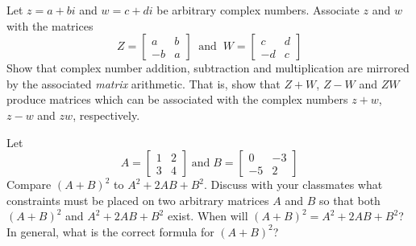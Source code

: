 \documentclass{ximera}
\begin{document}
\begin{problem}
Let $z = a + bi$ and $w = c + di$ be arbitrary complex numbers.  Associate $z$ and $w$ with the matrices \[Z = \left[ \begin{array}{rr} a & b \\ -b & a \end{array} \right] \;\; \mbox{and} \;\; W = \left[ \begin{array}{rr} c & d \\ -d & c \end{array} \right]\]  Show that complex number addition, subtraction and multiplication are mirrored by the associated \emph{matrix} arithmetic.  That is, show that $Z + W$, $Z - W$ and $ZW$ produce matrices which can be associated with the complex numbers $z + w$, $z - w$ and $zw$, respectively.
\end{problem}

\begin{problem}
Let \[A = \left[ \begin{array}{rr} 1 & 2 \\ 3 & 4 \end{array} \right] \; \mbox{and} \; B = \left[ \begin{array}{rr} 0 & -3 \\ -5 & 2 \end{array} \right]\]  Compare $(A + B)^{2}$ to $A^{2} + 2AB + B^{2}$.  Discuss with your classmates what constraints must be placed on two arbitrary matrices $A$ and $B$ so that both $(A + B)^{2}$ and $A^{2} + 2AB + B^{2}$ exist.  When will $(A + B)^{2} = A^{2} + 2AB + B^{2}$?  In general, what is the correct formula for $(A + B)^{2}$?
\end{problem}
\end{document}
